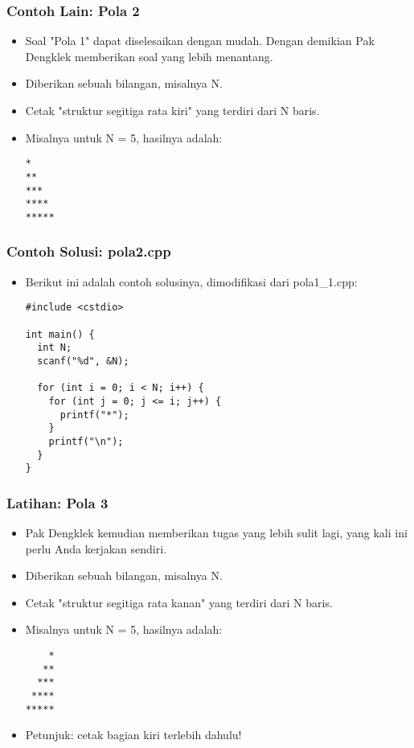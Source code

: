 \begin{frame}[fragile]
\frametitle{Contoh Lain: Pola 2}
\begin{itemize}
  \item Soal "Pola 1" dapat diselesaikan dengan mudah. Dengan demikian Pak Dengklek memberikan soal yang lebih menantang.
  \item Diberikan sebuah bilangan, misalnya N.
  \item Cetak "struktur segitiga rata kiri" yang terdiri dari N baris.
  \item Misalnya untuk N = 5, hasilnya adalah:
\begin{lstlisting}
*
**
***
****
*****
\end{lstlisting}
\end{itemize}
\end{frame}

\begin{frame}[fragile]
\frametitle{Contoh Solusi: pola2.cpp}
\begin{itemize}
  \item Berikut ini adalah contoh solusinya, dimodifikasi dari pola1\_1.cpp:
\begin{lstlisting}
#include <cstdio>

int main() {
  int N;
  scanf("%d", &N);

  for (int i = 0; i < N; i++) {
    for (int j = 0; j <= i; j++) {
      printf("*");
    }
    printf("\n");
  }
}
\end{lstlisting}
\end{itemize}
\end{frame}

\begin{frame}[fragile]
\frametitle{Latihan: Pola 3}
\begin{itemize}
  \item Pak Dengklek kemudian memberikan tugas yang lebih sulit lagi, yang kali ini perlu Anda kerjakan sendiri.
  \item Diberikan sebuah bilangan, misalnya N.
  \item Cetak "struktur segitiga rata kanan" yang terdiri dari N baris.
  \item Misalnya untuk N = 5, hasilnya adalah:
\begin{lstlisting}
    *
   **
  ***
 ****
*****
\end{lstlisting}
  \item Petunjuk: cetak bagian kiri terlebih dahulu!
\end{itemize}
\end{frame}

